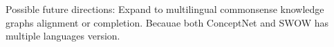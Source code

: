 \noindent Possible future directions: Expand to multilingual commonsense knowledge graphs alignment or completion. Becauae both ConceptNet and SWOW has multiple languages version.

\begin{comment}
beta1s=(0.05 0.05 0.05 0.05 0.05 0.05 0.05 0.05) 
beta2s=(0.05 0.08 0.08 0.08 0.08 0.08 0.08 0.05) 
lrs=(0.01 0.007 0.006 0.005 0.004 0.003 0.002 0.001

beta1s=(0.07 0.07 0.07 0.07 0.07 0.07 0.07 0.07) 
beta2s=(0.07 0.07 0.07 0.07 0.07 0.07 0.07 0.07) 
lrs=(0.01 0.007 0.006 0.005 0.004 0.003 0.002 0.001)

tensorboard --logdir=run11:"../../output/results/IPTransE/C_S_V6/271_5fold/1/20200622214135/train/",run12:"../../output/results/IPTransE/C_S_V6/271_5fold/1/20200622214135/valid/",run13:"../../output/results/IPTransE/C_S_V6/271_5fold/1/20200622214135/test/",run21:"../../output/results/IPTransE/C_S_V6/271_5fold/1/20200623041025/train/",run22:"../../output/results/IPTransE/C_S_V6/271_5fold/1/20200623041025/valid/",run23:"../../output/results/IPTransE/C_S_V6/271_5fold/1/20200623041025/test/",run31:"../../output/results/IPTransE/C_S_V6/271_5fold/1/20200623025154/train/",run32:"../../output/results/IPTransE/C_S_V6/271_5fold/1/20200623025154/valid/",run33:"../../output/results/IPTransE/C_S_V6/271_5fold/1/20200623025154/test/",run41:"../../output/results/IPTransE/C_S_V6/271_5fold/1/20200622233738/train/",run42:"../../output/results/IPTransE/C_S_V6/271_5fold/1/20200622233738/valid/",run43:"../../output/results/IPTransE/C_S_V6/271_5fold/1/20200622233738/test/",run51:"../../output/results/IPTransE/C_S_V6/271_5fold/1/20200623072050/train/",run52:"../../output/results/IPTransE/C_S_V6/271_5fold/1/20200623072050/valid/",run53:"../../output/results/IPTransE/C_S_V6/271_5fold/1/20200623072050/test/",run61:"../../output/results/IPTransE/C_S_V6/271_5fold/1/20200622233723/train/",run62:"../../output/results/IPTransE/C_S_V6/271_5fold/1/20200622233723/valid/",run63:"../../output/results/IPTransE/C_S_V6/271_5fold/1/20200622233723/test/",run71:"../../output/results/IPTransE/C_S_V6/271_5fold/1/20200622214236/train/",run72:"../../output/results/IPTransE/C_S_V6/271_5fold/1/20200622214236/valid/",run73:"../../output/results/IPTransE/C_S_V6/271_5fold/1/20200622214236/test/",run81:"../../output/results/IPTransE/C_S_V6/271_5fold/1/20200623061933/train/",run82:"../../output/results/IPTransE/C_S_V6/271_5fold/1/20200623061933/valid/",run83:"../../output/results/IPTransE/C_S_V6/271_5fold/1/20200623061933/test/"
\end{comment}